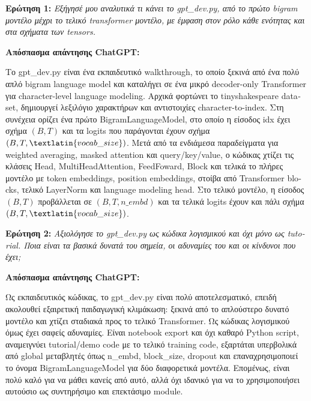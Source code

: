 \documentclass[11pt,a4paper]{article}
\begin{document}
\textbf{Ερώτηση 1:} \emph{Εξήγησέ μου αναλυτικά τι κάνει το \textlatin{gpt\_dev.py}, από το πρώτο \textlatin{bigram}
μοντέλο μέχρι το τελικό \textlatin{transformer} μοντέλο, με έμφαση στον ρόλο κάθε ενότητας και στα σχήματα των \textlatin{tensors}.}

\textbf{Απόσπασμα απάντησης \textlatin{ChatGPT}:}

Το \textlatin{gpt\_dev.py} είναι ένα εκπαιδευτικό \textlatin{walkthrough}, το οποίο ξεκινά από ένα πολύ απλό
\textlatin{bigram language model} και καταλήγει σε ένα μικρό \textlatin{decoder-only Transformer} για
\textlatin{character-level language modeling}. Αρχικά φορτώνει το \textlatin{tinyshakespeare dataset},
δημιουργεί λεξιλόγιο χαρακτήρων και αντιστοιχίες \textlatin{character-to-index}. Στη συνέχεια ορίζει ένα πρώτο
\textlatin{BigramLanguageModel}, στο οποίο η είσοδος \textlatin{idx} έχει σχήμα $(B,T)$ και τα \textlatin{logits}
που παράγονται έχουν σχήμα $(B,T,\textlatin{vocab\_size})$. Μετά από τα ενδιάμεσα παραδείγματα για
\textlatin{weighted averaging}, \textlatin{masked attention} και \textlatin{query/key/value}, ο κώδικας χτίζει τις
κλάσεις \textlatin{Head}, \textlatin{MultiHeadAttention}, \textlatin{FeedFoward}, \textlatin{Block} και τελικά
το πλήρες μοντέλο με \textlatin{token embeddings}, \textlatin{position embeddings}, στοίβα από
\textlatin{Transformer blocks}, τελικό \textlatin{LayerNorm} και \textlatin{language modeling head}. Στο τελικό
μοντέλο, η είσοδος $(B,T)$ προβάλλεται σε $(B,T,n\_embd)$ και τα τελικά \textlatin{logits} έχουν και πάλι σχήμα
$(B,T,\textlatin{vocab\_size})$.

\textbf{Ερώτηση 2:} \emph{Αξιολόγησε το \textlatin{gpt\_dev.py} ως κώδικα λογισμικού και όχι μόνο ως \textlatin{tutorial}.
Ποια είναι τα βασικά δυνατά του σημεία, οι αδυναμίες του και οι κίνδυνοι που έχει;}

\textbf{Απόσπασμα απάντησης \textlatin{ChatGPT}:}

Ως εκπαιδευτικός κώδικας, το \textlatin{gpt\_dev.py} είναι πολύ αποτελεσματικό, επειδή ακολουθεί εξαιρετική
παιδαγωγική κλιμάκωση: ξεκινά από το απλούστερο δυνατό μοντέλο και χτίζει σταδιακά προς το τελικό
\textlatin{Transformer}. Ως κώδικας λογισμικού όμως έχει σαφείς αδυναμίες. Είναι \textlatin{notebook export} και όχι
καθαρό \textlatin{Python script}, αναμειγνύει \textlatin{tutorial/demo code} με το τελικό \textlatin{training code},
εξαρτάται υπερβολικά από global μεταβλητές όπως \textlatin{n\_embd}, \textlatin{block\_size}, \textlatin{dropout}
και επαναχρησιμοποιεί το όνομα \textlatin{BigramLanguageModel} για δύο διαφορετικά μοντέλα. Επομένως, είναι πολύ
καλό για να μάθει κανείς από αυτό, αλλά όχι ιδανικό για να το χρησιμοποιήσει αυτούσιο ως συντηρήσιμο και επεκτάσιμο
\textlatin{module}.
\end{document}
